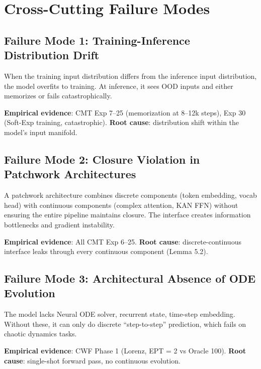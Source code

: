 \documentclass{article}
\begin{document}

\appendix

\section{Cross-Cutting Failure Modes}

\subsection{Failure Mode 1: Training-Inference Distribution Drift}

When the training input distribution differs from the inference input distribution, the model overfits to training. At inference, it sees OOD inputs and either memorizes or fails catastrophically.

\textbf{Empirical evidence}: CMT Exp 7--25 (memorization at 8--12k steps), Exp 30 (Soft-Exp training, catastrophic). \textbf{Root cause}: distribution shift within the model's input manifold.

\subsection{Failure Mode 2: Closure Violation in Patchwork Architectures}

A patchwork architecture combines discrete components (token embedding, vocab head) with continuous components (complex attention, KAN FFN) without ensuring the entire pipeline maintains closure. The interface creates information bottlenecks and gradient instability.

\textbf{Empirical evidence}: All CMT Exp 6--25. \textbf{Root cause}: discrete-continuous interface leaks through every continuous component (Lemma 5.2).

\subsection{Failure Mode 3: Architectural Absence of ODE Evolution}

The model lacks Neural ODE solver, recurrent state, time-step embedding. Without these, it can only do discrete ``step-to-step'' prediction, which fails on chaotic dynamics tasks.

\textbf{Empirical evidence}: CWF Phase 1 (Lorenz, EPT = 2 vs Oracle 100). \textbf{Root cause}: single-shot forward pass, no continuous evolution.
\end{document}
